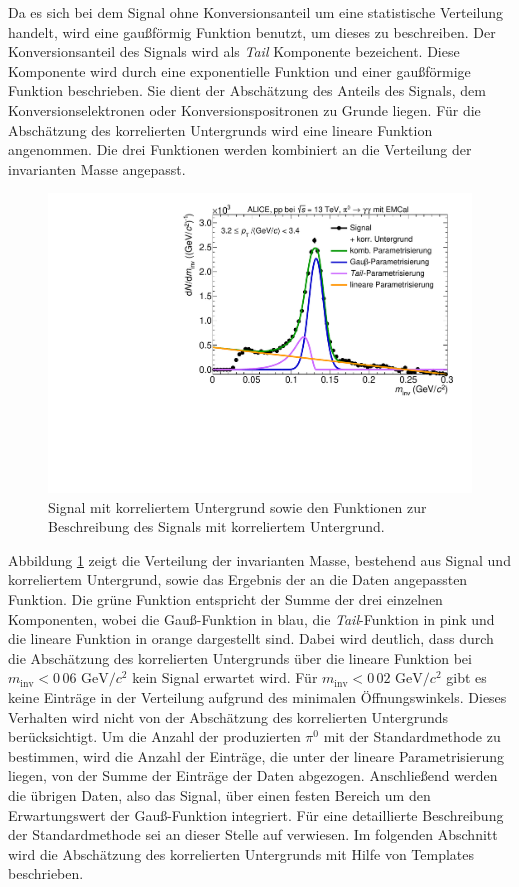 Da es sich bei dem Signal ohne Konversionsanteil um eine statistische Verteilung handelt, wird eine gaußförmig Funktion benutzt, um dieses zu beschreiben.
\newline
Der Konversionsanteil des Signals wird als \textit{Tail} Komponente bezeichent.
Diese Komponente wird durch eine exponentielle Funktion und einer gaußförmige Funktion beschrieben.
Sie dient der Abschätzung des Anteils des Signals, dem Konversionselektronen oder Konversionspositronen zu Grunde liegen.
Für die Abschätzung des korrelierten Untergrunds wird eine lineare Funktion angenommen.
Die drei Funktionen werden kombiniert an die Verteilung der invarianten Masse angepasst.
\begin{figure}[tp]
\centering
\includegraphics[width=.75\linewidth]{StandardParam.pdf}
\caption{Signal mit korreliertem Untergrund sowie den Funktionen zur Beschreibung des Signals mit korreliertem Untergrund.}
\label{figStandardParam}
\end{figure}
\newline
Abbildung \ref{figStandardParam} zeigt die Verteilung der invarianten Masse, bestehend aus Signal und korreliertem Untergrund, sowie das Ergebnis der an die Daten angepassten Funktion.
Die grüne Funktion entspricht der Summe der drei einzelnen Komponenten, wobei die Gauß-Funktion in blau, die \textit{Tail}-Funktion in pink und die lineare Funktion in orange dargestellt sind.
Dabei wird deutlich, dass durch die Abschätzung des korrelierten Untergrunds über die lineare Funktion bei $m_\text{inv} < 0\,06\text{ GeV}/c^{2}$ kein Signal erwartet wird.
Für $m_\text{inv} < 0\,02\text{ GeV}/c^{2}$ gibt es keine Einträge in der Verteilung aufgrund des minimalen Öffnungswinkels.
Dieses Verhalten wird nicht von der Abschätzung des korrelierten Untergrunds berücksichtigt.
\newline
Um die Anzahl der produzierten $\pi^{0}$ mit der Standardmethode zu bestimmen, wird die Anzahl der Einträge, die unter der lineare Parametrisierung liegen, von der Summe der Einträge der Daten abgezogen.
Anschließend werden die übrigen Daten, also das Signal, über einen festen Bereich um den Erwartungswert der Gauß-Funktion integriert.
Für eine detaillierte Beschreibung der Standardmethode sei an dieser Stelle auf \cite{thesis:Adrian} verwiesen.
\newline
Im folgenden Abschnitt wird die Abschätzung des korrelierten Untergrunds mit Hilfe von Templates beschrieben.